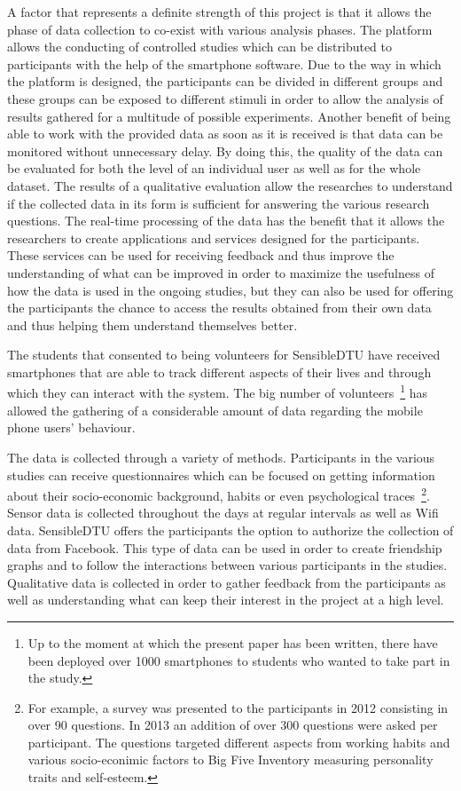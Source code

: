 A factor that represents a definite strength of this project is that it allows
the phase of data collection to co-exist with various analysis phases. The
platform allows the conducting of controlled studies which can be distributed to
participants with the help of the smartphone software. Due to the way in which
the platform is designed, the participants can be divided in different groups
and these groups can be exposed to different stimuli in order to allow the
analysis of results gathered for a multitude of possible experiments. Another
benefit of being able to work with the provided data as soon as it is received
is that data can be monitored without unnecessary delay. By doing this, the
quality of the data can be evaluated for both the level of an individual user as
well as for the whole dataset. The results of a qualitative evaluation allow the
researches to understand if the collected data in its form is sufficient for
answering the various research questions. The real-time processing of the data
has the benefit that it allows the researchers to create applications and
services designed for the participants. These services can be used for receiving
feedback and thus improve the understanding of what can be improved in order to
maximize the usefulness of how the data is used in the ongoing studies, but they
can also be used for offering the participants the chance to access the results
obtained from their own data and thus helping them understand themselves better.

The students that consented to being volunteers for SensibleDTU have received
smartphones that are able to track different aspects of their lives and through
which they can interact with the system. The big number of
volunteers~\footnote{Up to the moment at which the present paper has been
written, there have been deployed over 1000 smartphones to students who wanted
to take part in the study.} has allowed the gathering of a considerable amount
of data regarding the mobile phone users' behaviour. 

The data is collected through a variety of methods. Participants in the various
studies can receive questionnaires which can be focused on getting information
about their socio-economic background, habits or even psychological
traces~\footnote{For example, a survey was presented to the participants in 2012
consisting in over 90 questions. In 2013 an addition of over 300 questions were
asked per participant. The questions targeted different aspects from working
habits and various socio-econimic factors to Big Five Inventory measuring
personality traits \cite{John99} and self-esteem.}. Sensor data is collected
throughout the days at regular intervals as well as Wifi data. SensibleDTU
offers the participants the option to authorize the collection of data from
Facebook. This type of data can be used in order to create friendship graphs and
to follow the interactions between various participants in the studies.
Qualitative data is collected in order to gather feedback from the participants
as well as understanding what can keep their interest in the project at a high
level.

